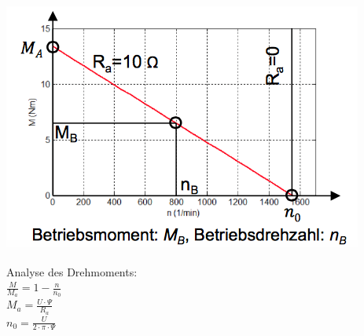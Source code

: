 \begin{minipage}{0.4 \linewidth}
\includegraphics[width = \linewidth]{./Pics/VL45/Nebenschluss2}
\end{minipage}
\begin{minipage}{0.6 \linewidth}
Analyse des Drehmoments: \\

$\frac{M}{M_a} = 1 - \frac{n}{n_0}$\\

$M_a = \frac{U \cdot \Psi}{R_a}$\\

$n_0 = \frac{U}{2 \cdot \pi \cdot \Psi}$
\end{minipage}